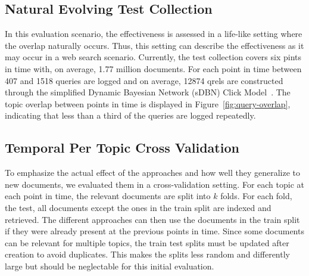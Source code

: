 \subsection{Natural Evolving Test Collection}
In this evaluation scenario, the effectiveness is assessed in a life-like setting where the overlap naturally occurs. Thus, this setting can describe the effectiveness as it may occur in a web search scenario. Currently, the test collection covers six pints in time with, on average, 1.77 million documents. For each point in time between 407 and 1518 queries are logged and on average, 12874 qrels are constructed through the simplified Dynamic Bayesian Network (sDBN) Click Model~\cite{chapelle:2009}. The topic overlap between points in time is displayed in Figure~\ref{fig:query-overlap}, indicating that less than a third of the queries are logged repeatedly.
\begin{table}[t]%
    \small%
    \centering%
    \renewcommand{\tabcolsep}{4pt}%
    \caption{ }%
    \label{tab:table-results}%
    
\end{table}  

\subsection{Temporal Per Topic Cross Validation}
To emphasize the actual effect of the approaches and how well they generalize to new documents, we evaluated them in a cross-validation setting. For each topic at each point in time, the relevant documents are split into $k$ folds. For each fold, the test, all documents except the ones in the train split are indexed and retrieved. The different approaches can then use the documents in the train split if they were already present at the previous points in time. Since some documents can be relevant for multiple topics, the train test splits must be updated after creation to avoid duplicates. This makes the splits less random and differently large but should be neglectable for this initial evaluation.


